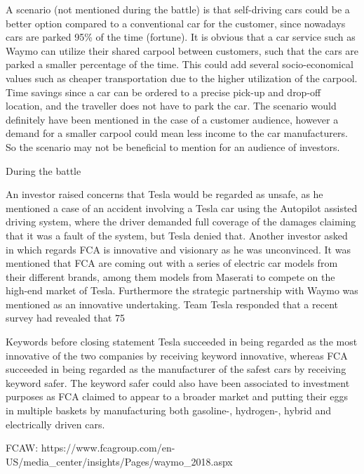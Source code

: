 A scenario (not mentioned during the battle) is that self-driving cars could be a better option compared to a conventional car for the customer, since nowadays cars are parked 95\% of the time (fortune). It is obvious that a car service such as Waymo can utilize their shared carpool between customers, such that the cars are parked a smaller percentage of the time. This could add several socio-economical values such as cheaper transportation due to the higher utilization of the carpool. Time savings since a car can be ordered to a precise pick-up and drop-off location, and the traveller does not have to park the car. The scenario would definitely have been mentioned in the case of a customer audience, however a demand for a smaller carpool could mean less income to the car manufacturers. So the scenario may not be beneficial to mention for an audience of investors.

During the battle

An investor raised concerns that Tesla would be regarded as unsafe, as he mentioned a case of an accident involving a Tesla car using the Autopilot assisted driving system, where the driver demanded full coverage of the damages claiming that it was a fault of the system, but Tesla denied that. Another investor asked in which regards FCA is innovative and visionary as he was unconvinced. It was mentioned that FCA are coming out with a series of electric car models from their different brands, among them models from Maserati to compete on the high-end market of Tesla. Furthermore the strategic partnership with Waymo was mentioned as an innovative undertaking. Team Tesla responded that a recent survey had revealed that 75%

Keywords before closing statement
Tesla succeeded in being regarded as the most innovative of the two companies by receiving keyword innovative, whereas FCA succeeded in being regarded as the manufacturer of the safest cars by receiving keyword safer. The keyword safer could also have been associated to investment purposes as FCA claimed to appear to a broader market and putting their eggs in multiple baskets by manufacturing both gasoline-, hydrogen-, hybrid and electrically driven cars.

FCAW: https://www.fcagroup.com/en-US/media_center/insights/Pages/waymo_2018.aspx